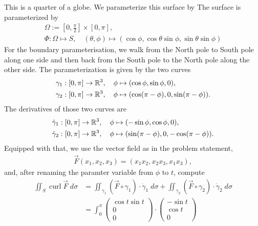 \documentclass[11pt]{article}
\begin{document}
\begin{solution}     
    This is a quarter of a globe. We parameterize this surface by 
    The surface is parameterized by 
    \begin{gather*}
        \Omega := [0,\tfrac{\pi}{2}] \times [0,\pi],
        \\
        \Phi : \Omega \mapsto S, \quad (\theta, \phi) \mapsto \left( \cos\phi, \cos\theta\sin\phi, \sin\theta\sin\phi \right)
    \end{gather*}
    For the boundary parameterisation, we walk from the North pole to South pole along one side and then back from the South pole to the North pole along the other side. 
    The parameterization is given by the two curves
    \begin{align*}
        &\gamma_1 : \left[0,\pi\right] \to \mathbb{R}^3, \quad \phi \mapsto (       \cos \phi, \sin \phi,               0 ),
        \\
        &\gamma_2 : \left[0,\pi\right] \to \mathbb{R}^3, \quad \phi \mapsto ( \cos (\pi-\phi),         0, \sin (\pi-\phi) ).
    \end{align*}
    The derivatives of those two curves are 
    \begin{align*}
        &\dot\gamma_{1} : \left[0,\pi\right] \to \mathbb{R}^3, \quad \phi \mapsto ( -\sin \phi, \cos \phi, 0 ),
        \\
        &\dot\gamma_{2} : \left[0,\pi\right] \to \mathbb{R}^3, \quad \phi \mapsto ( \sin(\pi-\phi), 0, -\cos(\pi-\phi) ).
    \end{align*}
    Equipped with that, we use the vector field as in the problem statement, 
    \begin{align*}
        \vec F( x_1, x_2, x_3 ) = \left( x_1 x_2, x_2 x_3, x_1 x_3 \right),
    \end{align*}
    and, after renaming the paramter variable from $\phi$ to $t$, compute 
    \begin{align*}
        \iint_{S} \operatorname{curl} \vec F \;d\sigma 
        &
        =  
        \iint_{\gamma_{1}} \left( \vec F\circ\gamma_{1} \right) \cdot \dot\gamma_{1} \;d\sigma 
        +
        \iint_{\gamma_{2}} \left( \vec F\circ\gamma_{2} \right) \cdot \dot\gamma_{2} \;d\sigma 
        \\&
        =  
        \int_0^{\pi} \begin{pmatrix} \cos t \sin t\\ 0 \\ 0\end{pmatrix}
        \cdot 
        \begin{pmatrix} -\sin t \\ \cos t \\ 0 \end{pmatrix} 

\end{align*}
\end{solution}
\end{document}
